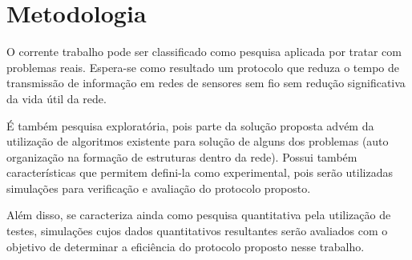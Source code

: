 \section{Metodologia}

O corrente trabalho pode ser classificado como pesquisa aplicada por tratar com problemas reais. Espera-se como resultado um protocolo que reduza o tempo de transmissão de informação em redes de sensores sem fio sem redução significativa da vida útil da rede. 

É também pesquisa exploratória, pois parte da solução proposta advém da utilização de algoritmos existente para solução de alguns dos problemas (auto organização na formação de estruturas dentro da rede). Possui também características que permitem defini-la como experimental, pois serão utilizadas simulações para verificação e avaliação do protocolo proposto.

Além disso, se caracteriza ainda como pesquisa quantitativa pela utilização de testes, simulações cujos dados quantitativos resultantes serão avaliados com o objetivo de determinar a eficiência do protocolo proposto nesse trabalho.
